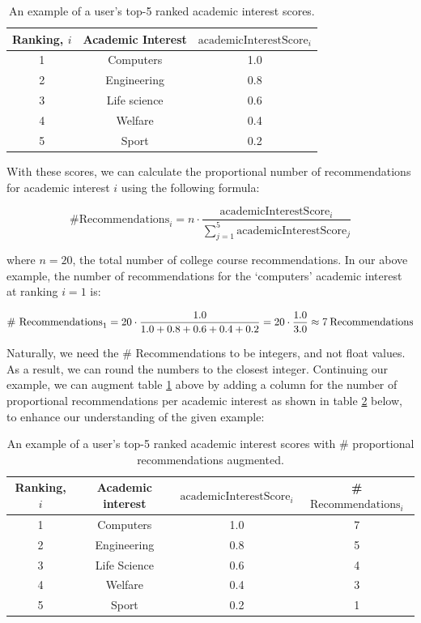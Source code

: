 \begin{table}[H]
\centering
\begin{tabular}{|c|c|c|}
\hline
\textbf{Ranking, $i$} & \textbf{Academic Interest} & \textbf{$\text{academicInterestScore}_i$}\\
\hline
1 & Computers & 1.0\\
\hline
2 & Engineering & 0.8\\
\hline
3 & Life science & 0.6\\
\hline
4 & Welfare & 0.4\\
\hline
5 & Sport & 0.2\\
\hline
\end{tabular}
\caption{An example of a user's top-5 ranked academic interest scores.}
\label{tab:academic-interests-example}
\end{table}

With these scores, we can calculate the proportional number of recommendations for academic interest $i$ using the following formula:

\[ \text{\# Recommendations}_i = n \cdot \frac{\text{academicInterestScore}_i}{\sum_{j=1}^{5} \text{academicInterestScore}_j}\]

where $n=20$, the total number of college course recommendations. In our above example, the number of recommendations for 
the `computers' academic interest at ranking $i=1$ is:

\[ \text{\# Recommendations}_1 = 20 \cdot \frac{1.0}{1.0+0.8+0.6+0.4+0.2} = 20 \cdot \frac{1.0}{3.0} \approx 7 \text{\:Recommendations}\]

Naturally, we need the \# Recommendations to be integers, and not float values. 
As a result, we can round the numbers to the closest integer.
Continuing our example, we can augment table \ref{tab:academic-interests-example} above by adding a column for the number of proportional recommendations 
per academic interest as shown in table \ref{tab:academic-interests-example-contd} below, to enhance our understanding of the given example:

\begin{table}[H]
\centering
\begin{tabular}{|c|c|c|c|}
\hline
\textbf{Ranking, $i$} & \textbf{Academic interest} & \textbf{$\text{academicInterestScore}_i$} & \textbf{\# $\text{Recommendations}_i$}\\
\hline
1 & Computers & 1.0 & 7\\
\hline
2 & Engineering & 0.8 & 5\\
\hline
3 & Life Science & 0.6 & 4\\
\hline
4 & Welfare & 0.4 & 3\\
\hline
5 & Sport & 0.2 & 1\\
\hline
\end{tabular}
\caption{An example of a user's top-5 ranked academic interest scores with \# proportional recommendations augmented.}
\label{tab:academic-interests-example-contd}
\end{table}

